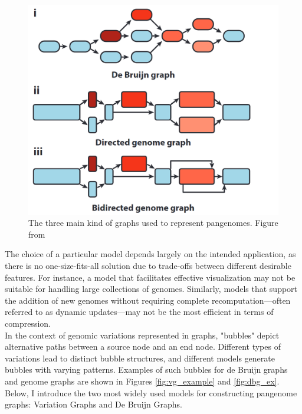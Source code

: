 \begin{figure}[h!]
	\centering
	\includegraphics[width=.75\linewidth]{figures/background/graph_types.png}
	\caption[Graph pangenome models.]{The three main kind of graphs used to represent pangenomes. Figure from~\cite{eizenga}}
	\label{fig:graph_types.png}
\end{figure}
The choice of a particular model depends largely on the intended application, as there is no one-size-fits-all solution due to trade-offs between different desirable features. For instance, a model that facilitates effective visualization may not be suitable for handling large collections of genomes. Similarly, models that support the addition of new genomes without requiring complete recomputation—often referred to as dynamic updates—may not be the most efficient in terms of compression.\\
In the context of genomic variations represented in graphs, "bubbles" depict alternative paths between a source node and an end node. Different types of variations lead to distinct bubble structures, and different models generate bubbles with varying patterns. Examples of such bubbles for de Bruijn graphs and genome graphs are shown in Figures \ref{fig:vg_example} and \ref{fig:dbg_ex}.\\
Below, I introduce the two most widely used models for constructing pangenome graphs: Variation Graphs and De Bruijn Graphs.

